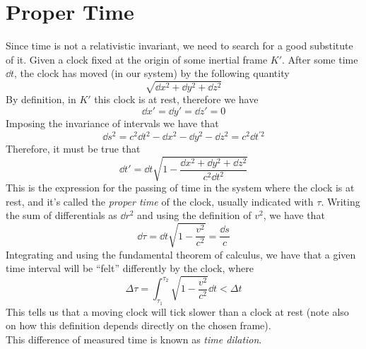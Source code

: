 \documentclass[../electromagnetism.tex]{subfiles}
\begin{document}
\section{Proper Time}
Since time is not a relativistic invariant, we need to search for a good substitute of it. Given a clock fixed at the origin of some inertial frame $K'$. After some time $\dd t$, the clock has moved (in our system) by the following quantity
\begin{equation*}
	\sqrt{\dd x^2+\dd y^2+\dd z^2}
\end{equation*}
By definition, in $K'$ this clock is at rest, therefore we have
\begin{equation*}
	\dd x'=\dd y'=\dd z'=0
\end{equation*}
Imposing the invariance of intervals we have that
\begin{equation}
	\dd s^2=c^2\dd t^2-\dd x^2-\dd y^2-\dd z^2=c^2\dd t^{'2}
	\label{eq:invclock}
\end{equation}
Therefore, it must be true that
\begin{equation}
	\dd t'=\dd t\sqrt{1-\frac{\dd x^2+\dd y^2+\dd z^2}{c^2\dd t^2}}
	\label{eq:proptime}
\end{equation}
This is the expression for the passing of time in the system where the clock is at rest, and it's called the \emph{proper time} of the clock, usually indicated with $\tau$. Writing the sum of differentials as $\dd r^2$ and using the definition of $v^2$, we have that
\begin{equation}
	\dd\tau=\dd t\sqrt{1-\frac{v^2}{c^2}}=\frac{\dd s}{c}
	\label{eq:diffprpot}
\end{equation}
Integrating and using the fundamental theorem of calculus, we have that a given time interval will be ``felt'' differently by the clock, where
\begin{equation}
	\Delta\tau=\int_{\tau_1}^{\tau_2}\sqrt{1-\frac{v^2}{c^2}}\dd t<\Delta t
	\label{eq:proptimeint}
\end{equation}
This tells us that a moving clock will tick slower than a clock at rest (note also on how this definition depends directly on the chosen frame).\\
This difference of measured time is known as \emph{time dilation}.
\end{document}

